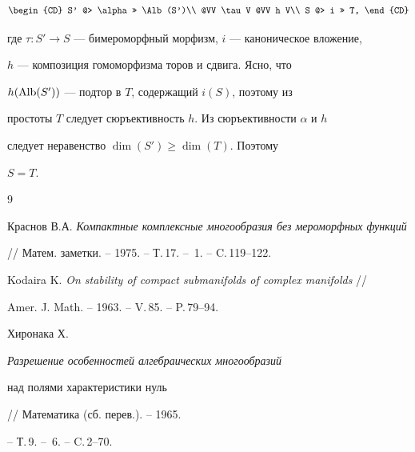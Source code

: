 \begin{pf}
$$


\begin{CD}


S' @> \alpha >> \Alb (S')\\


@VV \tau V @VV h V\\


S @> i >> T,


\end{CD}


$$


где $\tau:S'\to S$ --- бимероморфный морфизм, $i$ --- каноническое вложение,


$h$ --- композиция гомоморфизма торов и сдвига. Ясно, что


$h(\operatorname{Alb} (S'))$ --- подтор в $T$, содержащий $i(S)$, поэтому из


простоты $T$ следует сюръективность $h$. Из сюръективности $\alpha$ и $h$


следует неравенство $\dim (S')\geq\dim (T)$. Поэтому


$S=T$.


\end{pf}





\begin{thebibliography}{9}







Краснов В.А. {\em Компактные комплексные многообразия без мероморфных функций}


// Матем. заметки. -- 1975. -- Т.\,17. -- \No\,1. -- C.\,119--122.




Kodaira K. {\em On stability of compact submanifolds of complex manifolds} //


Amer. J. Math. -- 1963. -- V.\,85. -- P.\,79--94.




Хиронака Х. {\em Разрешение особенностей алгебраических многообразий


над полями характеристики нуль} // Математика (сб. перев.). -- 1965.


-- Т.\,9. -- \No\,6. -- C.\,2--70.





\end{thebibliography}





\vskip 2cm












\label{end}








